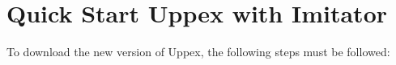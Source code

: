 \section{Quick Start Uppex with Imitator}

To download the new version of Uppex, the following steps must be followed:

